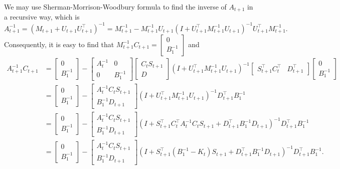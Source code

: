 We may use Sherman-Morrison-Woodbury formula to find the inverse of $A_{t+1}$ in a recursive way, which is 
\begin{equation}
A_{t+1}^{-1} = \left(M_{t+1}+U_{t+1}U_{t+1}^\top\right)^{-1}= M_{t+1}^{-1}-M_{t+1}^{-1}U_{t+1}\left(I+U_{t+1}^\top M_{t+1}^{-1}U_{t+1}\right)^{-1}U_{t+1}^\top M_{t+1}^{-1}.
\end{equation}
Consequently, it is easy to find that $M_{t+1}^{-1}C_{t+1} =\begin{bmatrix} 0 \\ B_1^{-1} \end{bmatrix} $ and 
\begin{align*}
A_{t+1}^{-1}C_{t+1} &= \begin{bmatrix} 0 \\ B_1^{-1} \end{bmatrix}  - \begin{bmatrix}
A_t^{-1} & 0 \\ 0 & B_1^{-1} \end{bmatrix} \begin{bmatrix} C_tS_{t+1} \\ D \end{bmatrix}
\left(I+U_{t+1}^\top M_{t+1}^{-1}U_{t+1}\right)^{-1}  \begin{bmatrix}
S_{t+1}^\top C_t^\top & D_{t+1}^\top \end{bmatrix} \begin{bmatrix} 0 \\ B_1^{-1} \end{bmatrix}  \\ 
& = \begin{bmatrix} 0 \\ B_1^{-1} \end{bmatrix}  - \begin{bmatrix}
A_t^{-1} C_tS_{t+1} \\B_1^{-1}D_{t+1} \end{bmatrix} 
\left(I+U_{t+1}^\top M_{t+1}^{-1}U_{t+1}\right)^{-1}  D_{t+1}^\top B_1^{-1} \\ 
& = \begin{bmatrix} 0 \\ B_1^{-1} \end{bmatrix}  - \begin{bmatrix}
A_t^{-1} C_tS_{t+1} \\B_1^{-1}D_{t+1} \end{bmatrix} 
\left(I+ S_{t+1}^\top C_t^\top A_t^{-1} C_t S_{t+1} +D_{t+1}^\top B_1^{-1}D_{t+1}  \right)^{-1}  D_{t+1}^\top B_1^{-1} \\ 
& = \begin{bmatrix} 0 \\ B_1^{-1} \end{bmatrix}  - \begin{bmatrix}
A_t^{-1} C_tS_{t+1} \\B_1^{-1}D_{t+1} \end{bmatrix} 
\left(I+ S_{t+1}^\top \left(B_1^{-1} - K_t\right)  S_{t+1} +D_{t+1}^\top B_1^{-1}D_{t+1}  \right)^{-1}  D_{t+1}^\top B_1^{-1}.
\end{align*}
